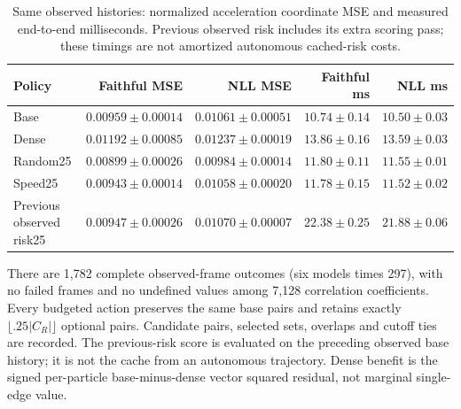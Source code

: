 \begin{table}[t]
\centering\small
\caption{Same observed histories: normalized acceleration coordinate MSE and measured end-to-end milliseconds. Previous observed risk includes its extra scoring pass; these timings are not amortized autonomous cached-risk costs.}
\label{tab:full-same-state}
\begin{tabular}{lrrrr}
\toprule
Policy & Faithful MSE & NLL MSE & Faithful ms & NLL ms\\
\midrule
Base & $0.00959\pm0.00014$ & $0.01061\pm0.00051$ & $10.74\pm0.14$ & $10.50\pm0.03$\\
Dense & $0.01192\pm0.00085$ & $0.01237\pm0.00019$ & $13.86\pm0.16$ & $13.59\pm0.03$\\
Random25 & $0.00899\pm0.00026$ & $0.00984\pm0.00014$ & $11.80\pm0.11$ & $11.55\pm0.01$\\
Speed25 & $0.00943\pm0.00014$ & $0.01058\pm0.00020$ & $11.78\pm0.15$ & $11.52\pm0.02$\\
Previous observed risk25 & $0.00947\pm0.00026$ & $0.01070\pm0.00007$ & $22.38\pm0.25$ & $21.88\pm0.06$\\
\bottomrule
\end{tabular}
\end{table}


There are 1,782 complete observed-frame outcomes (six models times 297),
with no failed frames and no undefined values among 7,128 correlation
coefficients. Every budgeted action preserves the same base pairs and
retains exactly $\lfloor.25|C_R|\rfloor$ optional pairs. Candidate pairs,
selected sets, overlaps and cutoff ties are recorded. The previous-risk score
is evaluated on the preceding observed base history; it is not the cache
from an autonomous trajectory. Dense benefit is the signed per-particle
base-minus-dense vector squared residual, not marginal single-edge value.


